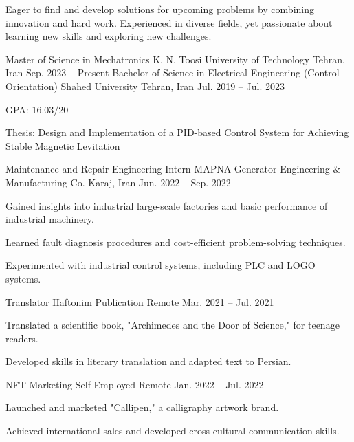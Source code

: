 \documentclass[11pt, a4paper]{awesome-cv}
\begin{document}
	
	\makecvheader[C]
	
	Eager to find and develop solutions for upcoming problems by combining innovation and hard work. Experienced in diverse fields, yet passionate about learning new skills and exploring new challenges.
	
	\cventry
	{Master of Science in Mechatronics}
	{K. N. Toosi University of Technology}
	{Tehran, Iran}
	{Sep. 2023 -- Present}
	{}
	{}
	\cventry
	{Bachelor of Science in Electrical Engineering (Control Orientation)}
	{Shahed University}
	{Tehran, Iran}
	{Jul. 2019 -- Jul. 2023}
	{
		\begin{cvitems}
			\item {GPA: 16.03/20}
			\item {Thesis: Design and Implementation of a PID-based Control System for Achieving Stable Magnetic Levitation}
		\end{cvitems}
	}
	
	\cventry
	{Maintenance and Repair Engineering Intern}
	{MAPNA Generator Engineering \& Manufacturing Co.}
	{Karaj, Iran}
	{Jun. 2022 -- Sep. 2022}
	{
		\begin{cvitems}
			\item {Gained insights into industrial large-scale factories and basic performance of industrial machinery.}
			\item {Learned fault diagnosis procedures and cost-efficient problem-solving techniques.}
			\item {Experimented with industrial control systems, including PLC and LOGO systems.}
		\end{cvitems}
	}
	
	\cventry
	{Translator}
	{Haftonim Publication}
	{Remote}
	{Mar. 2021 -- Jul. 2021}
	{
		\begin{cvitems}
			\item {Translated a scientific book, "Archimedes and the Door of Science," for teenage readers.}
			\item {Developed skills in literary translation and adapted text to Persian.}
		\end{cvitems}
	}
	
	\cventry
	{NFT Marketing}
	{Self-Employed}
	{Remote}
	{Jan. 2022 -- Jul. 2022}
	{
		\begin{cvitems}
			\item {Launched and marketed "Callipen," a calligraphy artwork brand.}
			\item {Achieved international sales and developed cross-cultural communication skills.}
		\end{cvitems}
	}
	
\end{document}
